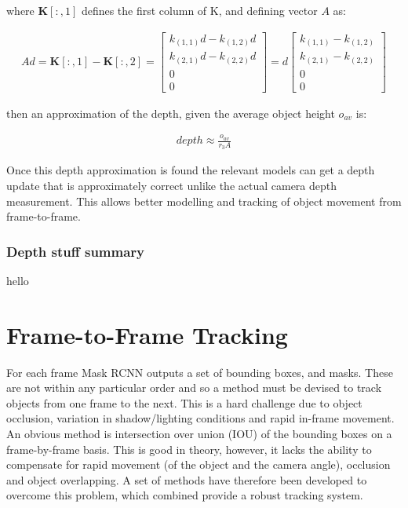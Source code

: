 \documentclass[a4paper,11pt,notitlepage]{article}
\begin{document}
where $\mathbf{K}[:,1]$ defines the first column of K, and defining vector $A$ as:

\begin{equation}
\begin{aligned}
A\mathit{d} = \mathbf{K}[:,1]- \mathbf{K}[:,2] = 
\begin{bmatrix}
	k_{(1,1)}\mathit{d} - k_{(1,2)}\mathit{d}\\
	k_{(2,1)}\mathit{d} - k_{(2,2)}\mathit{d}\\
	0\\
	0
\end{bmatrix}
= 
\mathit{d}
\begin{bmatrix}
	k_{(1,1)} - k_{(1,2)}\\
	k_{(2,1)} - k_{(2,2)}\\
	0\\
	0
\end{bmatrix}
\end{aligned}
\end{equation}

then an approximation of the depth, given the average object height $o_{av}$ is:

\begin{equation}
\begin{aligned}
depth \approx \frac{o_{av}}{r_{3}A} 
\end{aligned}
\end{equation}

Once this depth approximation is found the relevant models can get a depth update that is approximately correct unlike the actual camera depth measurement. This allows better modelling and tracking of object movement from frame-to-frame.


\subsubsection{Depth stuff summary}

hello
\section{Frame-to-Frame Tracking}

For each frame Mask RCNN outputs a set of bounding boxes, and masks. These are not within any particular order and so a method must be devised to track objects from one frame to the next. This is a hard challenge due to object occlusion, variation in shadow/lighting conditions and rapid in-frame movement. An obvious method is intersection over union (IOU) of the bounding boxes on a frame-by-frame basis. This is good in theory, however, it lacks the ability to compensate for rapid movement (of the object and the camera angle), occlusion and object overlapping. A set of methods have therefore been developed to overcome this problem, which combined provide a robust tracking system.
\end{document}

